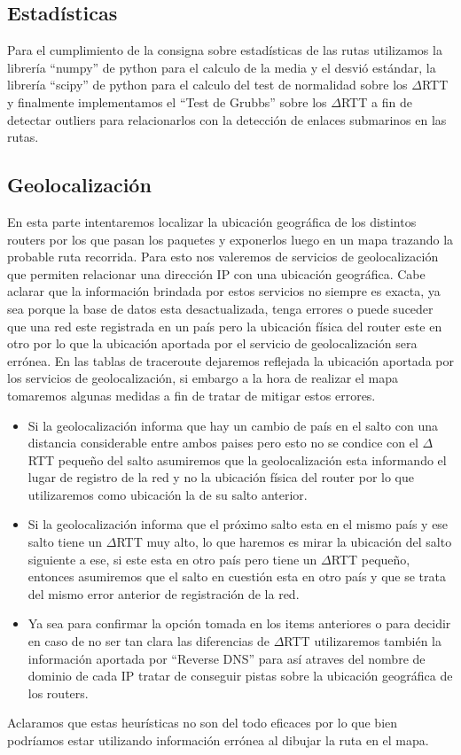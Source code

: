\subsection{Estadísticas}

Para el cumplimiento de la consigna sobre estadísticas de las rutas utilizamos la librería ``numpy'' de python para el calculo de la media y el desvió estándar, la librería ``scipy'' de python para el calculo del test de normalidad sobre los $\Delta$RTT y finalmente implementamos el ``Test de Grubbs'' sobre los $\Delta$RTT a fin de detectar outliers para relacionarlos con la detección de enlaces submarinos en las rutas.

\subsection{Geolocalización}

En esta parte intentaremos localizar la ubicación geográfica de los distintos routers por los que pasan los paquetes y exponerlos luego en un mapa trazando la probable ruta recorrida.
Para esto nos valeremos de servicios de geolocalización que permiten relacionar una dirección IP con una ubicación geográfica.
Cabe aclarar que la información brindada por estos servicios no siempre es exacta, ya sea porque la base de datos esta desactualizada, tenga errores o puede suceder que una red este registrada en un país pero la ubicación física del router este en otro por lo que la ubicación aportada por el servicio de geolocalización sera errónea.
En las tablas de traceroute dejaremos reflejada la ubicación aportada por los servicios de geolocalización, si embargo a la hora de realizar el mapa tomaremos algunas medidas a fin de tratar de mitigar estos errores.

\begin{itemize}
\item Si la geolocalización informa que hay un cambio de país en el salto con una distancia considerable entre ambos paises pero esto no se condice con el $\Delta$RTT pequeño del salto asumiremos que la geolocalización esta informando el lugar de registro de la red y no la ubicación física del router por lo que utilizaremos como ubicación la de su salto anterior.
\item Si la geolocalización informa que el próximo salto esta en el mismo país y ese salto tiene un $\Delta$RTT muy alto, lo que haremos es mirar la ubicación del salto siguiente a ese, si este esta en otro país pero tiene un $\Delta$RTT pequeño, entonces asumiremos que el salto en cuestión esta en otro país y que se trata del mismo error anterior de registración de la red.
\item Ya sea para confirmar la opción tomada en los items anteriores o para decidir en caso de no ser tan clara las diferencias de $\Delta$RTT utilizaremos también la información aportada por ``Reverse DNS'' para así atraves del nombre de dominio de cada IP tratar de conseguir pistas sobre la ubicación geográfica de los routers.
\end{itemize}

Aclaramos que estas heurísticas no son del todo eficaces por lo que bien podríamos estar utilizando información errónea al dibujar la ruta en el mapa.
